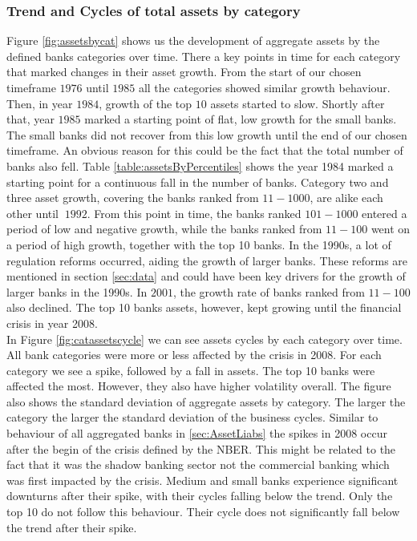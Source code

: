 \documentclass[12pt, a4paper]{article} %
\begin{document}
\subsubsection{Trend and Cycles of total assets by category}
Figure \ref{fig:assetsbycat} shows us the development of aggregate assets by the defined banks categories over time. 
There a key points in time for each category that marked changes in their asset growth. From the start of our chosen timeframe $1976$ until $1985$ all the categories showed similar growth behaviour. Then, in year $1984$, growth of the top $10$ assets started to slow. Shortly after that, year $1985$ marked a starting point of flat, low growth for the small banks. The small banks did not recover from this low growth until the end of our chosen timeframe. An obvious reason for this could be the fact that the  total number of banks also fell. Table \ref{table:assetsByPercentiles} shows the year 1984 marked a starting point for a continuous fall in the number of banks. Category two and three asset growth, covering the banks ranked from $11-1000$, are alike each other until $~1992$. From this point in time, the banks ranked $101-1000$ entered a period of low and negative growth, while the banks ranked from $11-100$ went on a period of high growth, together with the top 10 banks. In the 1990s, a lot of regulation reforms occurred, aiding the growth of larger banks. These reforms are mentioned in section \ref{sec:data} and could have been key drivers for the growth of larger banks in the 1990s. In $2001$, the growth rate of banks ranked from $11-100$ also declined. The top 10 banks assets, however, kept growing until the financial crisis in year 2008.\\
In Figure \ref{fig:catassetscycle} we can see assets cycles by each category over time. All bank categories were more or less affected by the crisis in 2008. For each category we see a spike, followed by a fall in assets. The top 10 banks were affected the most. However, they also have higher volatility overall. The figure also shows the standard deviation of aggregate assets by category. The larger the category the larger the standard deviation of the business cycles. Similar to behaviour of all aggregated banks in \ref{sec:AssetLiabs} the spikes in 2008 occur after the begin of the crisis defined by the NBER. This might be related to the fact that it was the shadow banking sector not the commercial banking which was first impacted by the crisis. Medium and small banks experience significant downturns after their spike, with their cycles falling below the trend. Only the top 10 do not follow this  behaviour. Their cycle does not significantly fall below the trend after their spike. 
\end{document}
